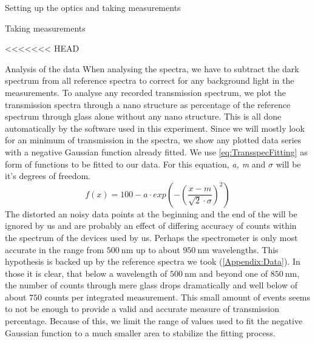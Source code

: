 \documentclass[pdftex, a4paper,11pt, twoside, UKenglish]{report}
\begin{document}
\begin{chapter}{Setting up the optics and taking measurements}
\begin{section}{Taking measurements}
      
    \end{section}
    
  \end{chapter}
<<<<<<< HEAD
  
  
  
  \begin{chapter}{Analysis of the data}
    \label{chp:Analysis}
    When analysing the spectra, we have to subtract the dark spectrum from
    all reference spectra to correct for any background light in the
    measurements.
    To analyse any recorded transmission spectrum, we plot the transmission
    spectra through a nano structure as percentage of the reference spectrum
    through glass alone without any nano structure.
    This is all done automatically by the software used in this experiment.
    Since we will mostly look for an minimum of transmission in the spectra,
    we show any plotted data series with a negative Gaussian function already
    fitted. We use \cref{eq:TransspecFitting} as form of functions to be fitted
    to our data. For this equation, \textit{a, m} and \textit{$\sigma$} will be
    it's degrees of freedom.
    \begin{equation}
      \label{eq:TransspecFitting}
      f(x)=100-a\cdot exp\left(-\left(\frac{x-m}{\sqrt{2}\cdot\sigma}
      \right)^{2}\right)
    \end{equation}
    The distorted an noisy data points at the beginning and the end of the
    will be ignored by us and are probably an effect of differing accuracy
    of counts within the spectrum  of the devices used by us.
    Perhaps the spectrometer is only most accurate in the range from
    $\SI{500}{\nano\meter}$ up to about $\SI{950}{\nano\meter}$ wavelengths.
    This hypothesis is backed up by the reference spectra we took 
    (\cref{Appendix:Data}).
    In those it is clear, that below a wavelength of $\SI{500}{\nano\meter}$
    and beyond one of $\SI{850}{\nano\meter}$, the number of counts through
    mere glass drops dramatically and well below of about $750$ counts per
    integrated measurement. This small amount of events seems to not be enough
    to provide a valid and accurate measure of transmission percentage.
    Because of this,  we limit the range of values used to fit the negative
    Gaussian function to a much smaller area to stabilize the fitting process.

\end{chapter}
\end{document}
